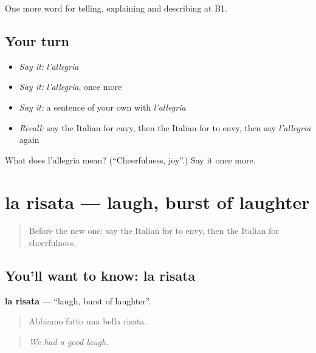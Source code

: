\begin{grammarlens}[title={What you've built}]
One more word for telling, explaining and describing at B1.
\end{grammarlens}

\subsection*{Your turn}
\begin{itemize}
\raggedright
  \item \emph{Say it:} \emph{l'allegria}
  \item \emph{Say it:} \emph{l'allegria}, once more
  \item \emph{Say it:} a sentence of your own with \emph{l'allegria}
  \item \emph{Recall:} say the Italian for envy, then the Italian for to envy, then say \emph{l'allegria} again
\end{itemize}

\begin{tcolorbox}[breakable,colback=teal!4,colframe=teal!35!black,title={Before you move on}]
What does l'allegria mean? (\textquotedblleft{}Cheerfulness, joy\textquotedblright{}.) Say it once more.
\end{tcolorbox}
\section[la risata]{la risata — laugh, burst of laughter}

\label{lesson:IT-C479-risata}



\begin{quote}
Before the new one: say the Italian for to envy, then the Italian for cheerfulness.
\end{quote}

\subsection*{You'll want to know: la risata}
\textbf{la risata} — \textquotedblleft{}laugh, burst of laughter\textquotedblright{}.

\begin{quote}
Abbiamo fatto una bella risata.
\end{quote}

\begin{quote}
\emph{We had a good laugh.}
\end{quote}

